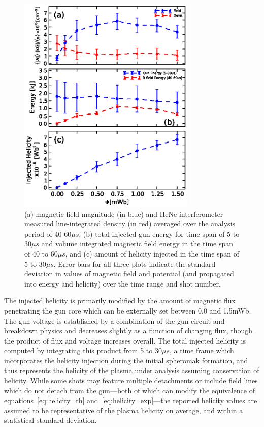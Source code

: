 \documentclass[aps,prl,amsmath,amssymb,reprint,superscriptaddress]{revtex4-1} %
\begin{document}
\begin{figure}[!htbp]
\centerline{
\includegraphics[width=8.5cm]{figure1.eps}}
\caption{\label{fig:helicity_scaling} (a) magnetic field magnitude (in blue) and HeNe interferometer measured line-integrated density (in red) averaged over the analysis period of 40-60$\mu s$, (b) total injected gun energy for time span of 5 to 30$\mu s$ and volume integrated magnetic field energy in the time span of 40 to 60$\mu s$, and (c) amount of helicity injected in the time span of 5 to 30$\mu s$. Error bars for all three plots indicate the standard deviation in values of magnetic field and potential (and propagated into energy and helicity) over the time range and shot number.}
\end{figure}

The injected helicity is primarily modified by the amount of magnetic flux penetrating the gun core which can be externally set between 0.0 and 1.5mWb. The gun voltage is established by a combination of the gun circuit and breakdown physics and decreases slightly as a function of changing flux, though the product of flux and voltage increases overall. The total injected helicity is computed by integrating this product from 5 to 30$\mu s$, a time frame which incorporates the helicity injection during the initial spheromak formation, and thus represents the helicity of the plasma under analysis assuming conservation of helicity. While some shots may feature multiple detachments or include field lines which do not detach from the gun---both of which can modify the equivalence of equations~\ref{eq:helicity_th} and~\ref{eq:helicity_exp}---the reported helicity values are assumed to be representative of the plasma helicity on average, and within a statistical standard deviation.
\end{document}
